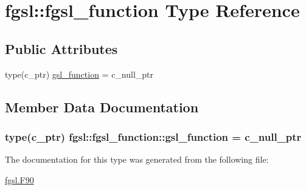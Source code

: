 \hypertarget{structfgsl_1_1fgsl__function}{\section{fgsl\-:\-:fgsl\-\_\-function Type Reference}
\label{structfgsl_1_1fgsl__function}
}
\subsection*{Public Attributes}
\begin{DoxyCompactItemize}
\item 
type(c\-\_\-ptr) \hyperlink{structfgsl_1_1fgsl__function_af51a7fb8249a2737a6799d55f7c08960}{gsl\-\_\-function} = c\-\_\-null\-\_\-ptr
\end{DoxyCompactItemize}


\subsection{Member Data Documentation}
\hypertarget{structfgsl_1_1fgsl__function_af51a7fb8249a2737a6799d55f7c08960}{
\subsubsection[{gsl\-\_\-function}]{\setlength{\rightskip}{0pt plus 5cm}type(c\-\_\-ptr) fgsl\-::fgsl\-\_\-function\-::gsl\-\_\-function = c\-\_\-null\-\_\-ptr}}\label{structfgsl_1_1fgsl__function_af51a7fb8249a2737a6799d55f7c08960}


The documentation for this type was generated from the following file\-:\begin{DoxyCompactItemize}
\item 
\hyperlink{fgsl_8F90}{fgsl.\-F90}\end{DoxyCompactItemize}
